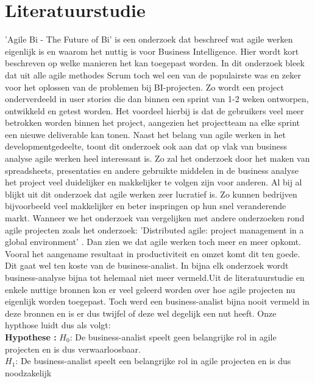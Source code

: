 \documentclass{hogent-article}
\begin{document}
	
	\section{Literatuurstudie}
	
	
	'Agile Bi - The Future of Bi'\autocite{Muntean2013} is een onderzoek dat beschreef wat agile werken eigenlijk is en waarom het nuttig is voor Business Intelligence. Hier wordt kort beschreven op welke manieren het kan toegepast worden. In dit onderzoek bleek dat uit alle agile methodes Scrum toch wel een van de populairste was en zeker voor het oplossen van de problemen bij BI-projecten. Zo wordt een project onderverdeeld in user stories die dan binnen een sprint van 1-2 weken ontworpen, ontwikkeld en getest worden. Het voordeel hierbij is dat de gebruikers veel meer betrokken worden binnen het project, aangezien het projectteam na elke sprint een nieuwe deliverable kan tonen. Naast het belang van agile werken in het developmentgedeelte, toont dit onderzoek ook aan dat op vlak van business analyse agile werken heel interessant is. Zo zal het onderzoek door het maken van spreadsheets, presentaties en andere gebruikte middelen in de business analyse het project veel duidelijker en makkelijker te volgen zijn voor anderen. Al bij al blijkt uit dit onderzoek dat agile werken zeer lucratief is. Zo kunnen bedrijven bijvoorbeeld veel makkelijker en beter inspringen op hun snel veranderende markt. \newline\newline Wanneer we het onderzoek van \autocite{Muntean2013} vergelijken met andere onderzoeken rond agile projecten zoals het onderzoek: 'Distributed agile: project management in a global environment' \autocite{LeeYong2009}. Dan zien we dat agile werken toch meer en meer opkomt. Vooral het aangename resultaat in productiviteit en omzet komt dit ten goede.  Dit gaat wel ten koste van de business-analist. In bijna elk onderzoek wordt business-analyse bijna tot helemaal niet meer vermeld.\newline \newline Uit de literatuurstudie en enkele nuttige bronnen kon er veel geleerd worden over hoe agile projecten nu eigenlijk worden toegepast. Toch werd een business-analist bijna nooit vermeld in deze bronnen en is er dus twijfel of deze wel degelijk een nut heeft. Onze hypthose luidt dus als volgt:\newline\\
	\textbf{Hypothese :}\newline
	$H_0$: De business-analist speelt geen belangrijke rol in agile projecten en is dus verwaarloosbaar. \\
	$H_1$: De business-analist speelt een belangrijke rol in agile projecten en is dus noodzakelijk \\ \bigskip
\end{document}
